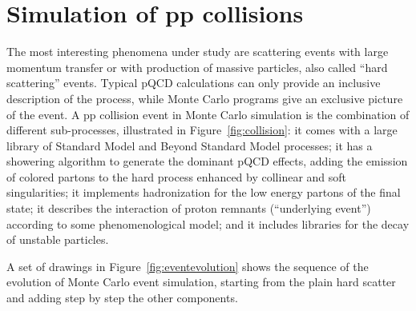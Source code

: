 \section{Simulation of pp collisions}\label{sec:MCsimulation}

The most interesting phenomena under study are scattering events with 
large momentum transfer or with production of massive particles, also
called ``hard scattering'' events.
Typical pQCD calculations can only provide an inclusive description of
the process, while Monte Carlo programs give an exclusive picture
of the event. 
A pp collision event in Monte Carlo simulation
is the combination of different sub-processes,
illustrated in Figure~\ref{fig:collision}: %
it comes with a large library of
Standard Model and Beyond Standard Model processes;
it has a showering algorithm to 
generate the dominant pQCD effects, adding the emission of colored partons
to the hard process enhanced by collinear and soft singularities;
it implements hadronization for the low energy partons of the final
state; it describes the interaction of proton remnants 
(``underlying event'') according to some phenomenological
model; and it includes libraries for the decay of unstable particles.

A set of drawings in Figure~\ref{fig:eventevolution} shows the sequence
of the evolution of Monte Carlo event simulation, starting from the
plain hard scatter and adding step by step the other components.


